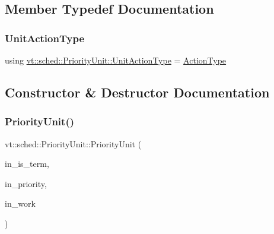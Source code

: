 \subsection{Member Typedef Documentation}
\mbox{\label{structvt_1_1sched_1_1_priority_unit_aadc2c7160cb86f45260dbdd2d39b1b68}} 
\subsubsection{\texorpdfstring{Unit\+Action\+Type}{UnitActionType}}
{\footnotesize\ttfamily using \hyperlink{structvt_1_1sched_1_1_priority_unit_aadc2c7160cb86f45260dbdd2d39b1b68}{vt\+::sched\+::\+Priority\+Unit\+::\+Unit\+Action\+Type} =  \hyperlink{namespacevt_ae0a5a7b18cc99d7b732cb4d44f46b0f3}{Action\+Type}}



\subsection{Constructor \& Destructor Documentation}
\mbox{\label{structvt_1_1sched_1_1_priority_unit_ae0f822497e235515829b196c0a78d07f}} 
\subsubsection{\texorpdfstring{Priority\+Unit()}{PriorityUnit()}}
{\footnotesize\ttfamily vt\+::sched\+::\+Priority\+Unit\+::\+Priority\+Unit (\begin{DoxyParamCaption}\item[{bool}]{in\+\_\+is\+\_\+term,  }\item[{\hyperlink{namespacevt_a86bff9f556eb761b27fc8600d006ac04}{Priority\+Type}}]{in\+\_\+priority,  }\item[{\hyperlink{structvt_1_1sched_1_1_priority_unit_aadc2c7160cb86f45260dbdd2d39b1b68}{Unit\+Action\+Type}}]{in\+\_\+work }\end{DoxyParamCaption})\hspace{0.3cm}{\ttfamily [inline]}}



